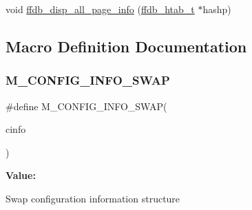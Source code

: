 \begin{DoxyCompactItemize}
\item 
void \mbox{\hyperlink{adat-devel_2other__libs_2filedb_2filehash_2ffdb__page_8c_ac254808e8682b803227a95d1af805d24}{ffdb\+\_\+disp\+\_\+all\+\_\+page\+\_\+info}} (\mbox{\hyperlink{adat-devel_2other__libs_2filedb_2filehash_2ffdb__hash_8h_ae592010ed2bedc975d3cc0b7d074b9d1}{ffdb\+\_\+htab\+\_\+t}} $\ast$hashp)
\end{DoxyCompactItemize}


\subsection{Macro Definition Documentation}
\mbox{\label{adat-devel_2other__libs_2filedb_2filehash_2ffdb__page_8c_ad1406cd2c8fb1cb6be848850dc9b6e59}} 
\subsubsection{\texorpdfstring{M\_CONFIG\_INFO\_SWAP}{M\_CONFIG\_INFO\_SWAP}}
{\footnotesize\ttfamily \#define M\+\_\+\+C\+O\+N\+F\+I\+G\+\_\+\+I\+N\+F\+O\+\_\+\+S\+W\+AP(\begin{DoxyParamCaption}\item[{}]{cinfo }\end{DoxyParamCaption})}

{\bfseries Value\+:}
\begin{DoxyCode}{0}
\DoxyCodeLine{\textcolor{keywordflow}{do} \{                                                         \(\backslash\)}

\end{DoxyCode}
Swap configuration information structure \mbox{\label{adat-devel_2other__libs_2filedb_2filehash_2ffdb__page_8c_a66223908ca98eb9b0172bd57425ee6c6}} 

